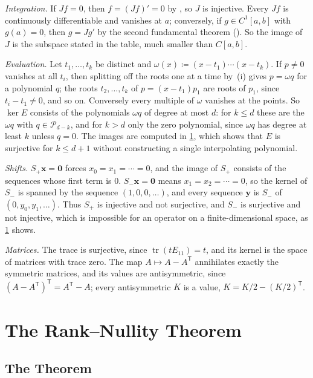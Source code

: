 \emph{Integration.} If $Jf=0$, then $f=(Jf)'=0$ by , so $J$ is injective. Every $Jf$ is continuously differentiable and vanishes at $a$; conversely, if $g\in C^1[a,b]$ with $g(a)=0$, then $g=Jg'$ by the second fundamental theorem (). So the image of $J$ is the subspace stated in the table, much smaller than $C[a,b]$.

\emph{Evaluation.} Let $t_1,\ldots,t_k$ be distinct and $\omega(x)\coloneqq(x-t_1)\cdots(x-t_k)$. If $p\ne0$ vanishes at all $t_i$, then splitting off the roots one at a time by \,(i) gives $p=\omega q$ for a polynomial $q$; the roots $t_2,\ldots,t_k$ of $p=(x-t_1)p_1$ are roots of $p_1$, since $t_i-t_1\ne0$, and so on. Conversely every multiple of $\omega$ vanishes at the points. So $\ker E$ consists of the polynomials $\omega q$ of degree at most $d$: for $k\le d$ these are the $\omega q$ with $q\in\mathcal P_{d-k}$, and for $k>d$ only the zero polynomial, since $\omega q$ has degree at least $k$ unless $q=0$. The images are computed in \cref{sec:rank-nullity}, which shows that $E$ is surjective for $k\le d+1$ without constructing a single interpolating polynomial.

\emph{Shifts.} $S_+\mathbf x=\mathbf 0$ forces $x_0=x_1=\cdots=0$, and the image of $S_+$ consists of the sequences whose first term is $0$. $S_-\mathbf x=\mathbf 0$ means $x_1=x_2=\cdots=0$, so the kernel of $S_-$ is spanned by the sequence $(1,0,0,\ldots)$, and every sequence $\mathbf y$ is $S_-$ of $(0,y_0,y_1,\ldots)$. Thus $S_+$ is injective and not surjective, and $S_-$ is surjective and not injective, which is impossible for an operator on a finite-dimensional space, as \cref{sec:rank-nullity} shows.

\emph{Matrices.} The trace is surjective, since $\operatorname{tr}(tE_{11})=t$, and its kernel is the space of matrices with trace zero. The map $A\mapsto A-A^{\mathsf T}$ annihilates exactly the symmetric matrices, and its values are antisymmetric, since $(A-A^{\mathsf T})^{\mathsf T}=A^{\mathsf T}-A$; every antisymmetric $K$ is a value, $K=K/2-(K/2)^{\mathsf T}$.

\section{The Rank--Nullity Theorem}
\label{sec:rank-nullity}

\subsection{The Theorem}

